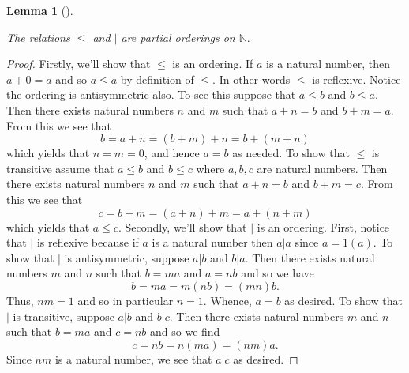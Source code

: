 \documentclass[
  twoside,
  12pt,
  letterpaper]{article}
\theoremstyle{definition}
\theoremstyle{definition}
\theoremstyle{plain}
\theoremstyle{definition}
\theoremstyle{plain}
\newtheorem{lemma}{Lemma}[section]
\theoremstyle{remark}
\begin{document}
\begin{lemma}[]\protect\hypertarget{lem-partial-orderings-on-natural-numbers}{}\label{lem-partial-orderings-on-natural-numbers}

The relations \(\leq\) and \(\vert\) are partial orderings on
\(\mathbb{N}.\)

\end{lemma}

\begin{proof}

Firstly, we'll show that \(\leq\) is an ordering. If \(a\) is a natural
number, then \(a+0 = a\) and so \(a\leq a\) by definition of \(\leq\).
In other words \(\leq\) is reflexive. Notice the ordering is
antisymmetric also. To see this suppose that \(a\leq b\) and
\(b\leq a\). Then there exists natural numbers \(n\) and \(m\) such that
\(a+n = b\) and \(b+m = a\). From this we see that \begin{equation}
\label{additive-antisymmetric}
b=a+n=(b+m)+n=b+(m+n)
\end{equation} which yields that \(n=m=0\), and hence \(a=b\) as needed.
To show that \(\leq\) is transitive assume that \(a\leq b\) and
\(b\leq c\) where \(a,b,c\) are natural numbers. Then there exists
natural numbers \(n\) and \(m\) such that \(a+n = b\) and \(b+m = c\).
From this we see that \begin{equation}
\label{additive-transitive}
c=b+m=(a+n)+m=a+(n+m)
\end{equation} which yields that \(a\leq c\). Secondly, we'll show that
\(\vert\) is an ordering. First, notice that \(|\) is reflexive because
if \(a\) is a natural number then \(a|a\) since \(a=1(a)\). To show that
\(|\) is antisymmetric, suppose \(a|b\) and \(b|a\). Then there exists
natural numbers \(m\) and \(n\) such that \(b=m a\) and \(a=n b\) and so
we have \begin{equation}
\label{multiplicative-antisymmetric}
b=ma=m(nb)=(mn)b.
\end{equation} Thus, \(nm=1\) and so in particular \(n=1.\) Whence,
\(a=b\) as desired. To show that \(|\) is transitive, suppose \(a|b\)
and \(b|c.\) Then there exists natural numbers \(m\) and \(n\) such that
\(b=m a\) and \(c=nb\) and so we find \begin{equation}
\label{multiplicative-transitive}
c=nb=n(ma)=(nm)a.
\end{equation} Since \(nm\) is a natural number, we see that \(a|c\) as
desired.

\end{proof}
\end{document}
